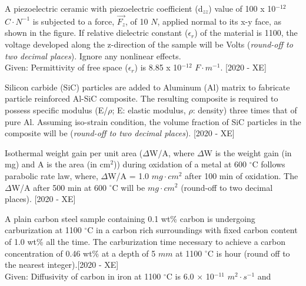     \item A piezoelectric ceramic with piezoelectric coefficient (d$_{zz}$) value of 100 x 10$^{-12}$ $C\cdot N^{-1}$ is subjected to a force, $\vec{F_z}$, of 10 $N$, applied normal to its x-y face, as shown in the figure. If relative dielectric constant ($\epsilon_r$) of the material is 1100, the voltage developed along the z-direction of the sample will be Volts \underline{\hspace{3cm}}(\textit{round-off to two decimal places}). Ignore any nonlinear effects.\\
    Given: Permittivity of free space ($\epsilon_r$) is 8.85 x 10$^{-12}$ $F\cdot m^{-1}$. \hfill{[2020 - XE]}
    

    \item Silicon carbide (SiC) particles are added to Aluminum (Al) matrix to fabricate particle reinforced Al-SiC composite. The resulting composite is required to possess specific modulus (E/$\rho$; E: elastic modulus, $\rho$: density) three times that of pure Al. Assuming iso-strain condition, the volume fraction of SiC particles in the composite will be (\textit{round-off to two decimal places}). \hfill{[2020 - XE]}
    \begin{table}[h]
        \centering
        
    \end{table}
    \item Isothermal weight gain per unit area ($\Delta$W/A, where $\Delta$W is the weight gain (in mg) and A is the area (in cm$^2$)) during oxidation of a metal at 600 $^\circ$C follows parabolic rate law, where, $\Delta$W/A = 1.0 $mg\cdot cm^2$ after 100 min of oxidation. The $\Delta$W/A after 500 min at 600 $^\circ$C will be $mg\cdot cm^2$ (round-off to two decimal places). \hfill{[2020 - XE]}
    \item A plain carbon steel sample containing 0.1 wt\% carbon is undergoing carburization at 1100 $^\circ$C in a carbon rich surroundings with fixed carbon content of 1.0 wt\% all the time. The carburization time necessary to achieve a carbon concentration of 0.46 wt\% at a depth of 5 $mm$ at 1100 $^\circ$C is \underline{\hspace{3cm}}hour (round off to the nearest integer).\hfill{[2020 - XE]} \\
    Given: Diffusivity of carbon in iron at 1100 $^\circ$C is 6.0 $\times$ 10$^{-11}$ $m^2\cdot s^{-1}$ and 
    \begin{table}[h]
        \centering
        
    \end{table}


